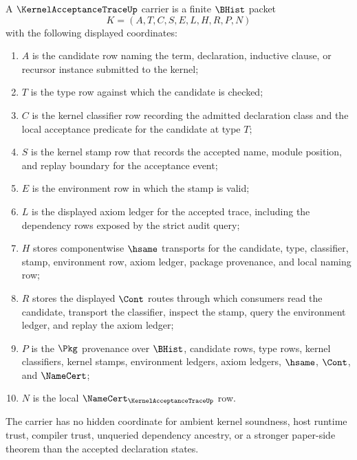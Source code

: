 \begin{definition}
\label{def:kernel-acceptance-trace-carrier}
A $\KernelAcceptanceTraceUp$ carrier is a finite $\BHist$ packet
$$
K=(A,T,C,S,E,L,H,R,P,N)
$$
with the following displayed coordinates:
\begin{enumerate}
\item $A$ is the candidate row naming the term, declaration, inductive clause, or recursor instance submitted to the kernel;
\item $T$ is the type row against which the candidate is checked;
\item $C$ is the kernel classifier row recording the admitted declaration class and the local acceptance predicate for the candidate at type $T$;
\item $S$ is the kernel stamp row that records the accepted name, module position, and replay boundary for the acceptance event;
\item $E$ is the environment row in which the stamp is valid;
\item $L$ is the displayed axiom ledger for the accepted trace, including the dependency rows exposed by the strict audit query;
\item $H$ stores componentwise $\hsame$ transports for the candidate, type, classifier, stamp, environment row, axiom ledger, package provenance, and local naming row;
\item $R$ stores the displayed $\Cont$ routes through which consumers read the candidate, transport the classifier, inspect the stamp, query the environment ledger, and replay the axiom ledger;
\item $P$ is the $\Pkg$ provenance over $\BHist$, candidate rows, type rows, kernel classifiers, kernel stamps, environment ledgers, axiom ledgers, $\hsame$, $\Cont$, and $\NameCert$;
\item $N$ is the local $\NameCert_{\KernelAcceptanceTraceUp}$ row.
\end{enumerate}
The carrier has no hidden coordinate for ambient kernel soundness, host runtime trust, compiler trust, unqueried dependency ancestry, or a stronger paper-side theorem than the accepted declaration states.
\end{definition}

